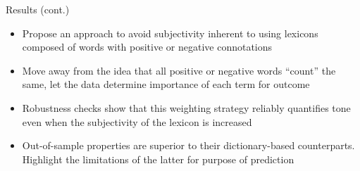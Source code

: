 \documentclass[english]{beamer}
\begin{document}
\begin{frame}{Results (cont.)}
\begin{itemize}
\setlength{\itemsep}{1.5em}
\item Propose an approach to avoid subjectivity inherent to using lexicons composed of words with positive or negative connotations

\item Move away from the idea that all positive or negative words ``count'' the same, let the data determine importance of each term for outcome

\item Robustness checks show that this weighting strategy reliably quantifies tone even when the subjectivity of the lexicon is increased
\item Out-of-sample properties are superior to their dictionary-based counterparts. Highlight the limitations of the latter for purpose of prediction
\end{itemize}
\end{frame}
\end{document}
